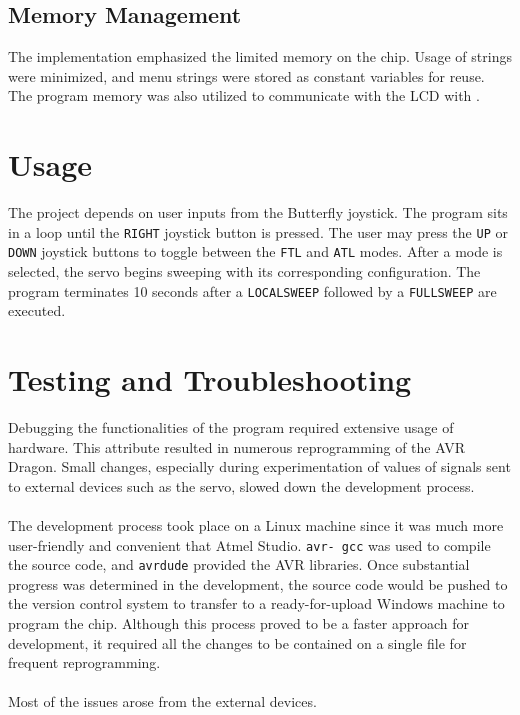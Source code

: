 \documentclass[usletter, 12pt]{article}
\begin{document}
    \subsection{Memory Management} The implementation emphasized the limited
    memory on the chip. Usage of strings were minimized, and menu strings were
    stored as constant  variables for reuse. The program
    memory was also utilized to communicate with the LCD with
    .

    \section{Usage} The project depends on user inputs from the Butterfly
    joystick. The program sits in a loop until the \texttt{RIGHT} joystick
    button is pressed. The user may press the \texttt{UP} or \texttt{DOWN}
    joystick buttons to toggle between the \texttt{FTL} and \texttt{ATL} modes.
    After a mode is selected, the servo begins sweeping with its corresponding
    configuration. The program terminates 10 seconds after a
    \texttt{LOCALSWEEP} followed by a \texttt{FULLSWEEP} are executed.

    \section{Testing and Troubleshooting} Debugging the functionalities of the
    program required extensive usage of hardware. This attribute resulted in
    numerous reprogramming of the AVR Dragon. Small changes, especially during
    experimentation of values of signals sent to external devices such as the
    servo, slowed down the development process. \\~\\
    \noindent The development process took place on a Linux machine since it
    was much more user-friendly and convenient that Atmel Studio. \texttt{avr-
    gcc} was used to compile the source code, and \texttt{avrdude} provided the
    AVR libraries. Once substantial progress was determined in the development,
    the source code would be pushed to the version control system to transfer
    to a ready-for-upload Windows machine to program the chip. Although this
    process proved to be a faster approach for development, it required all the
    changes to be contained on a single file for frequent reprogramming. \\~\\
    \noindent Most of the issues arose from the external devices.
\end{document}
